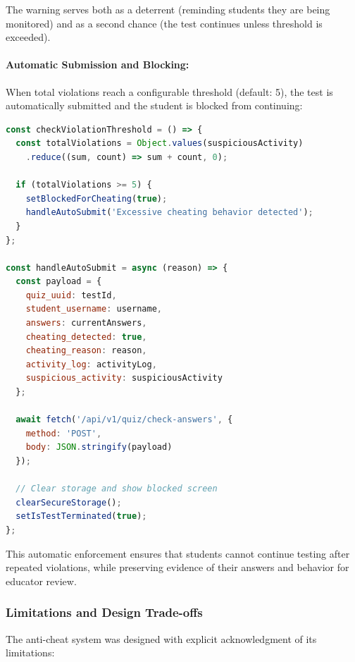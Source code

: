 The warning serves both as a deterrent (reminding students they are being monitored) and as a second chance (the test continues unless threshold is exceeded).

\paragraph{Automatic Submission and Blocking:}
When total violations reach a configurable threshold (default: 5), the test is automatically submitted and the student is blocked from continuing:

\begin{lstlisting}[language=JavaScript, caption={Violation Threshold Enforcement}]
const checkViolationThreshold = () => {
  const totalViolations = Object.values(suspiciousActivity)
    .reduce((sum, count) => sum + count, 0);
  
  if (totalViolations >= 5) {
    setBlockedForCheating(true);
    handleAutoSubmit('Excessive cheating behavior detected');
  }
};

const handleAutoSubmit = async (reason) => {
  const payload = {
    quiz_uuid: testId,
    student_username: username,
    answers: currentAnswers,
    cheating_detected: true,
    cheating_reason: reason,
    activity_log: activityLog,
    suspicious_activity: suspiciousActivity
  };
  
  await fetch('/api/v1/quiz/check-answers', {
    method: 'POST',
    body: JSON.stringify(payload)
  });
  
  // Clear storage and show blocked screen
  clearSecureStorage();
  setIsTestTerminated(true);
};
\end{lstlisting}

This automatic enforcement ensures that students cannot continue testing after repeated violations, while preserving evidence of their answers and behavior for educator review.

\subsubsection{Limitations and Design Trade-offs}

The anti-cheat system was designed with explicit acknowledgment of its limitations:

